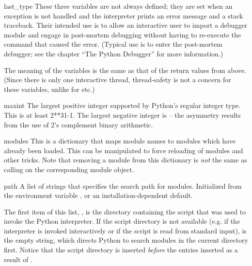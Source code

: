 \begin{datadesc}{last_type}
These three variables are not always defined; they are set when an
exception is not handled and the interpreter prints an error message
and a stack traceback.  Their intended use is to allow an interactive
user to import a debugger module and engage in post-mortem debugging
without having to re-execute the command that caused the error.
(Typical use is  to enter the post-mortem
debugger; see the chapter ``The Python Debugger'' for more
information.)

The meaning of the variables is the same
as that of the return values from  above.
(Since there is only one interactive thread, thread-safety is not a
concern for these variables, unlike for  etc.)
\end{datadesc}

\begin{datadesc}{maxint}
The largest positive integer supported by Python's regular integer
type.  This is at least 2**31-1.  The largest negative integer is
 -- the asymmetry results from the use of 2's
complement binary arithmetic.
\end{datadesc}

\begin{datadesc}{modules}
  This is a dictionary that maps module names to modules which have
  already been loaded.  This can be manipulated to force reloading of
  modules and other tricks.  Note that removing a module from this
  dictionary is \emph{not} the same as calling
   on the corresponding module
  object.
\end{datadesc}

\begin{datadesc}{path}
  A list of strings that specifies the search path for modules.
  Initialized from the environment variable , or an
  installation-dependent default.  

The first item of this list, , is the 
directory containing the script that was used to invoke the Python 
interpreter.  If the script directory is not available (e.g.  if the 
interpreter is invoked interactively or if the script is read from 
standard input),  is the empty string, which directs 
Python to search modules in the current directory first.  Notice that 
the script directory is inserted \emph{before} the entries inserted as 
a result of .  
\end{datadesc}

